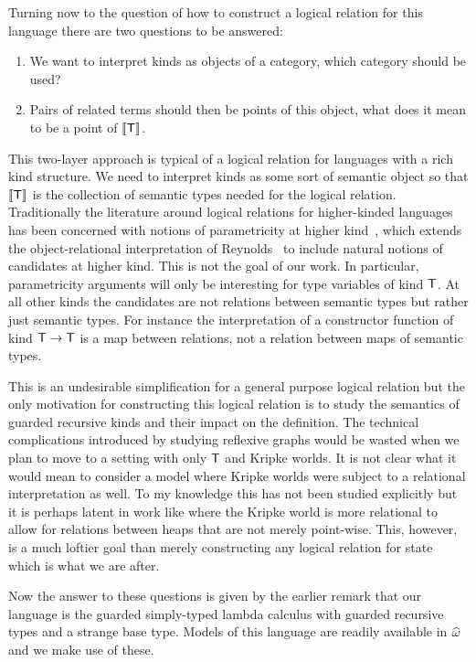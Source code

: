 Turning now to the question of how to construct a logical relation for
this language there are two questions to be answered:
\begin{enumerate}
\item We want to interpret kinds as objects of a category, which
  category should be used?
\item Pairs of related terms should then be points of this object,
  what does it mean to be a point of $\llbracket \mathsf{T} \rrbracket$.
\end{enumerate}
This two-layer approach is typical of a logical relation for languages
with a rich kind structure. We need to interpret kinds as some sort of
semantic object so that $\llbracket \mathsf{T} \rrbracket$ is the collection of semantic
types needed for the logical relation. Traditionally the literature
around logical relations for higher-kinded languages has been
concerned with notions of parametricity at higher
kind~\citep{TODO-ROSILINI-DUNPHY-REDDY-ATKEY-TAKEUTI-WEIRICH},
which extends the object-relational interpretation of
Reynolds~\citep{TODO-ORIGINAL-PARAMETRICITY} to include natural
notions of candidates at higher kind. This is not the goal of our
work. In particular, parametricity arguments will only be
interesting for type variables of kind $\mathsf{T}$. At all other kinds the
candidates are not relations between semantic types but rather just
semantic types. For instance the interpretation of a constructor
function of kind $\mathsf{T} \to \mathsf{T}$ is a map between relations, not a
relation between maps of semantic types.

This is an undesirable simplification for a general purpose logical
relation but the only motivation for constructing this logical
relation is to study the semantics of guarded recursive kinds and
their impact on the definition. The technical complications introduced
by studying reflexive graphs would be wasted when we plan to move to a
setting with only $\mathsf{T}$ and Kripke worlds. It is not clear what it
would mean to consider a model where Kripke worlds were subject to a
relational interpretation as well. To my knowledge this has not been
studied explicitly but it is perhaps latent in work like
\citet{TODO-DREYER} where the Kripke world is more relational to allow
for relations between heaps that are not merely point-wise. This,
however, is a much loftier goal than merely constructing any logical
relation for state which is what we are after.

Now the answer to these questions is given by the earlier remark that
our language is the guarded simply-typed lambda calculus with guarded
recursive types and a strange base type. Models of this language are
readily available in $\widehat{\omega}$~\citep{TODO-LARS} and we
make use of these.

